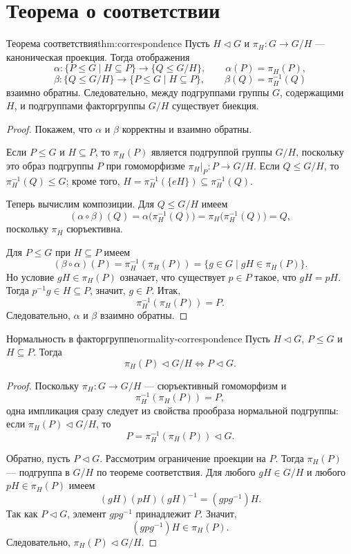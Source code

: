 
\section{Теорема о соответствии}

\begin{Theorem}{Теорема соответствия}{thm:correspondence}
	Пусть $H\triangleleft G$ и $\pi_H\colon G\to G/H$ --- каноническая проекция. Тогда отображения
	\[
	\alpha\colon \{P\le G\mid H\subseteq P\}\to \{Q\le G/H\}, \qquad \alpha(P)=\pi_H(P),
	\]
	\[
	\beta\colon \{Q\le G/H\}\to \{P\le G\mid H\subseteq P\}, \qquad \beta(Q)=\pi_H^{-1}(Q)
	\]
	взаимно обратны. Следовательно, между подгруппами группы $G$, содержащими $H$, и подгруппами факторгруппы $G/H$ существует биекция.
\end{Theorem}

\begin{proof}
	Покажем, что $\alpha$ и $\beta$ корректны и взаимно обратны.

	Если $P\le G$ и $H\subseteq P$, то $\pi_H(P)$ является подгруппой группы $G/H$, поскольку это образ подгруппы $P$ при гомоморфизме $\pi_H|_P\colon P\to G/H$. Если $Q\le G/H$, то $\pi_H^{-1}(Q)\le G$; кроме того, $H=\pi_H^{-1}(\{eH\})\subseteq \pi_H^{-1}(Q)$.

	Теперь вычислим композиции. Для $Q\le G/H$ имеем
	\[
	(\alpha\circ\beta)(Q)=\alpha\bigl(\pi_H^{-1}(Q)\bigr)=\pi_H\bigl(\pi_H^{-1}(Q)\bigr)=Q,
	\]
	поскольку $\pi_H$ сюръективна.

	Для $P\le G$ при $H\subseteq P$ имеем
	\[
	(\beta\circ\alpha)(P)=\pi_H^{-1}(\pi_H(P))=\{g\in G\mid gH\in \pi_H(P)\}.
	\]
	Но условие $gH\in \pi_H(P)$ означает, что существует $p\in P$ такое, что $gH=pH$. Тогда $p^{-1}g\in H\subseteq P$, значит, $g\in P$. Итак,
	\[
	\pi_H^{-1}(\pi_H(P))=P.
	\]
	Следовательно, $\alpha$ и $\beta$ взаимно обратны.
\end{proof}

\begin{Statement}{Нормальность в факторгруппе}{normality-correspondence}
	Пусть $H\triangleleft G$, $P\le G$ и $H\subseteq P$. Тогда
	\[
	\pi_H(P) \triangleleft G/H \Longleftrightarrow P \triangleleft G.
	\]
\end{Statement}

\begin{proof}
	Поскольку $\pi_H\colon G\to G/H$ --- сюръективный гомоморфизм и
	\[
	\pi_H^{-1}(\pi_H(P))=P,
	\]
	одна импликация сразу следует из свойства прообраза нормальной подгруппы:
	если $\pi_H(P)\triangleleft G/H$, то
	\[
	P=\pi_H^{-1}(\pi_H(P))\triangleleft G.
	\]

	Обратно, пусть $P\triangleleft G$. Рассмотрим ограничение проекции на $P$. Тогда $\pi_H(P)$ --- подгруппа в $G/H$ по теореме соответствия. Для любого $gH\in G/H$ и любого $pH\in \pi_H(P)$ имеем
	\[
	(gH)(pH)(gH)^{-1}=(gpg^{-1})H.
	\]
	Так как $P\triangleleft G$, элемент $gpg^{-1}$ принадлежит $P$. Значит,
	\[
	(gpg^{-1})H\in \pi_H(P).
	\]
	Следовательно, $\pi_H(P)\triangleleft G/H$.
\end{proof}
